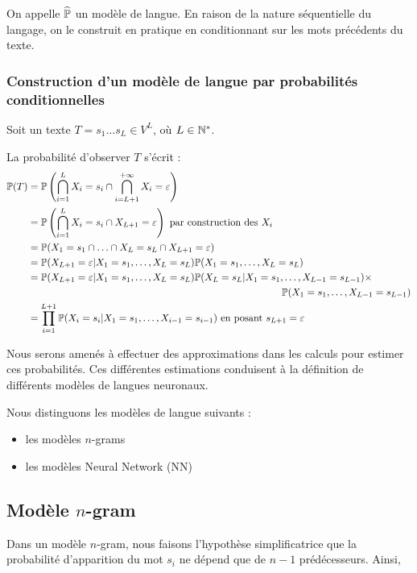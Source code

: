 On appelle $\widehat{\P}$ un modèle de langue. En raison de la nature séquentielle du langage, on le construit en pratique en conditionnant sur les mots précédents du texte.


\subsubsection{Construction d'un modèle de langue par probabilités conditionnelles}
Soit un texte $T=s_1\ldots s_L \in V^L$, où $L \in\N^*$.

La probabilité d'observer $T$ s'écrit :
\begin{align*}
  \P(T) &= \P\left(\bigcap_{i=1}^L X_i=s_i \cap \bigcap_{i=L+1}^{+\infty} X_i = \varepsilon\right) \\
  &= \P\left(\bigcap_{i=1}^L X_i=s_i \cap X_{L+1} = \varepsilon  \right) \text{ par construction des } X_i\\
  &= \P(X_1 = s_1 \cap \ldots \cap X_L = s_L \cap X_{L+1} = \varepsilon) \\
  &= \P(X_{L+1}=\varepsilon \vert X_1=s_1,\ldots, X_L=s_L)\P(X_1=s_1,\ldots, X_L=s_L) \\
  &= \P(X_{L+1}=\varepsilon \vert X_1=s_1,\ldots, X_L=s_L)\P(X_L=s_L\vert X_1=s_1,\ldots, X_{L-1}=s_{L-1}) \times \\
  & \hspace{9cm}\P(X_1=s_1 ,\ldots, X_{L-1}=s_{L-1}) \\
  &=\prod_{i=1}^{L+1} \P(X_i=s_i \vert X_1=s_1,\ldots, X_{i-1}=s_{i-1}) \text{ en posant } s_{L+1} = \varepsilon
\end{align*}


Nous serons amenés à effectuer des approximations dans les calculs pour estimer ces probabilités. Ces différentes estimations conduisent à la définition de différents modèles de langues neuronaux.

Nous distinguons les modèles de langue suivants :

\begin{itemize}
  \item les modèles $n$-grams
  \item les modèles Neural Network (NN)
\end{itemize}

\subsection{Modèle $n$-gram}
Dans un modèle $n$-gram, nous faisons l'hypothèse simplificatrice que la probabilité d'apparition du mot $s_i$ ne dépend que de $n-1$ prédécesseurs. Ainsi,

